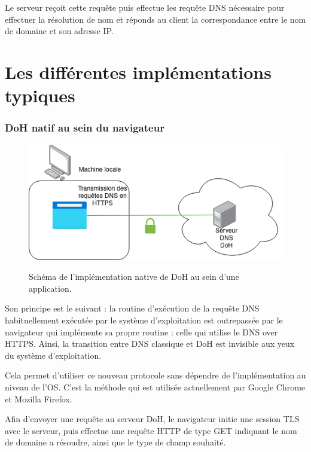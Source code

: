 \documentclass[a4paper,12pt]{article}
\begin{document}
	Le serveur reçoit cette requête puis effectue les requête DNS nécessaire pour effectuer la résolution de nom et réponds au client la correspondance entre le nom de domaine et son adresse IP.
	
	
	\section{Les différentes implémentations typiques}
	
	\subsubsection{DoH natif au sein du navigateur}
	
	\begin{figure}[H]
		\begin{center}
			{\includegraphics[scale=0.6]{Images/schema_doh_native.png}}
		\end{center}
		\caption{Schéma de l'implémentation native de DoH au sein d'une application.}
	\end{figure}

	Son principe est le suivant : la routine d'exécution de la requête DNS habituellement exécutée par le système d'exploitation est outrepassée par le navigateur qui implémente sa propre routine : celle qui utilise le DNS over HTTPS. Ainsi, la transition entre DNS classique et DoH est invisible aux yeux du système d'exploitation. 
	
	Cela permet d'utiliser ce nouveau protocole sans dépendre de l'implémentation au niveau de l'OS. C'est la méthode qui est utilisée actuellement par Google Chrome et Mozilla Firefox.
	
	Afin d'envoyer une requête au serveur DoH, le navigateur initie une session TLS avec le serveur, puis  effectue une requête HTTP de type GET indiquant le nom de domaine a résoudre, ainsi que le type de champ souhaité.
	
\end{document}
